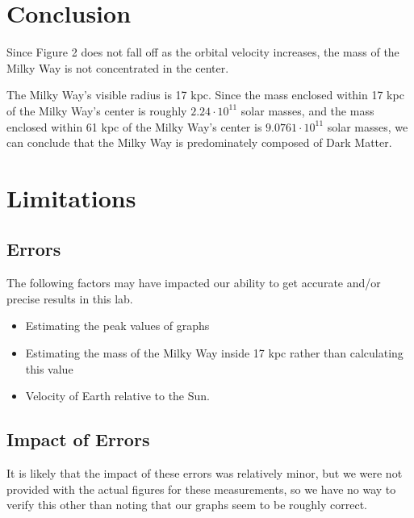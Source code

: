 \documentclass{article}
\begin{document}
\pagebreak

\section{Conclusion}

Since Figure 2 does not fall off as the orbital velocity increases, the mass of the Milky Way is not concentrated in the center.

The Milky Way's visible radius is 17 kpc.
Since the mass enclosed within 17 kpc of the Milky Way's center is roughly $2.24 \cdot 10^{11}$ solar masses, and the mass enclosed within 61 kpc of the Milky Way's center is $9.0761 \cdot 10^{11}$ solar masses, we can conclude that the Milky Way is predominately composed of Dark Matter.

\section{Limitations}

\subsection{Errors}
The following factors may have impacted our ability to get accurate and/or
precise results in this lab.

\begin{itemize}
    \item Estimating the peak values of graphs 
    \item Estimating the mass of the Milky Way inside 17 kpc rather than calculating this value
    \item Velocity of Earth relative to the Sun.
\end{itemize}

\subsection{Impact of Errors}

It is likely that the impact of these errors was relatively minor, but we were not provided with the actual figures for these measurements, so we have no way to verify this other than noting that our graphs seem to be roughly correct.
\end{document}
